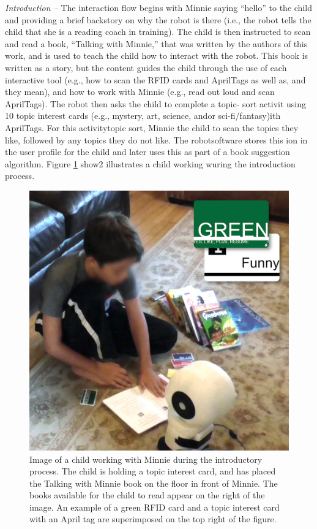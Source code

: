 \documentclass{sigchi}
\begin{document}
\textit{Introduction --} The interaction flow begins with Minnie saying ``hello'' to the child and providing a brief backstory on why the robot is there (i.e., the robot tells the child that she is a reading coach in training). The child is then instructed to scan and read a book, ``Talking with Minnie,'' that was written by the authors of this work, and is used to teach the child how to interact with the robot. This book is written as a story, but the content guides the child through the use of each interactive tool (e.g., how to scan the RFID cards and AprilTags as well as, and they mean), and how to work with Minnie (e.g., read out loud and scan AprilTags). The robot then asks the child to complete a topic- sort activit using 10 topic interest cards (e.g., mystery, art, science, andor sci-fi/fantasy)ith AprilTags. For this activitytopic sort, Minnie the child to scan the topics they like, followed by any topics they do not like. The robotsoftware stores this ion in the user profile for the child and later uses this as part of a book suggestion algorithm. Figure \ref{fig:introduction} show2 illustrates a child working wuring the introduction process.
\begin{figure}
	\centering
	\includegraphics[width=1\columnwidth]{figures/Child-with-Minnie}
	\caption{Image of a child working with Minnie during the introductory process. The child is holding a topic interest card, and has placed the Talking with Minnie book on the floor in front of Minnie. The books available for the child to read appear on the right of the image. An example of a green RFID card and a topic interest card with an April tag are superimposed on the top right of the figure.}
	\label{fig:introduction}
\end{figure}
\end{document}
